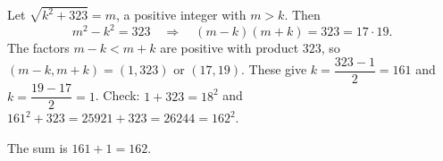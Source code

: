 Let $\sqrt{k^2+323}=m$, a positive integer with $m>k$. Then
\[
m^2-k^2=323\quad\Longrightarrow\quad (m-k)(m+k)=323=17\cdot19 .
\]
The factors $m-k<m+k$ are positive with product $323$, so $(m-k,m+k)=(1,323)$ or $(17,19)$. These give $k=\dfrac{323-1}{2}=161$ and $k=\dfrac{19-17}{2}=1$. Check: $1+323=18^2$ and $161^2+323=25921+323=26244=162^2$.

The sum is $161+1=\boxed{162}$.

